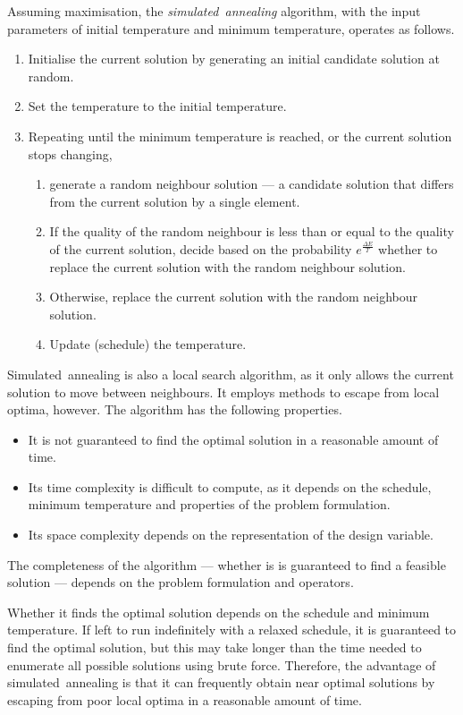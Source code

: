 Assuming maximisation, the \emph{simulated~annealing} algorithm, with the input parameters of initial temperature and minimum temperature, operates as follows.
\begin{enumerate}
  \item Initialise the current solution by generating an initial candidate solution at random.
  \item Set the temperature to the initial temperature.
  \item Repeating until the minimum temperature is reached, or the current solution stops changing,
  \begin{enumerate}
    \item generate a random neighbour solution --- a candidate solution that differs from the current solution by a single element.
    \item If the quality of the random neighbour is less than or equal to the quality of the current solution, decide based on the probability \( e^{\frac{\Delta E}{T}} \) whether to replace the current solution with the random neighbour solution.
    \item Otherwise, replace the current solution with the random neighbour solution.
    \item Update (schedule) the temperature.
  \end{enumerate}
\end{enumerate}

Simulated~annealing is also a local search algorithm, as it only allows the current solution to move between neighbours.
It employs methods to escape from local optima, however.
The algorithm has the following properties.
\begin{itemize}
  \item It is not guaranteed to find the optimal solution in a reasonable amount of time.
  \item Its time complexity is difficult to compute, as it depends on the schedule, minimum temperature and properties of the problem formulation.
  \item Its space complexity depends on the representation of the design variable.
\end{itemize}

The completeness of the algorithm --- whether is is guaranteed to find a feasible solution --- depends on the problem formulation and operators.

Whether it finds the optimal solution depends on the schedule and minimum temperature.
If left to run indefinitely with a relaxed schedule, it is guaranteed to find the optimal solution, but this may take longer than the time needed to enumerate all possible solutions using brute force.
Therefore, the advantage of simulated~annealing is that it can frequently obtain near optimal solutions by escaping from poor local optima in a reasonable amount of time.

